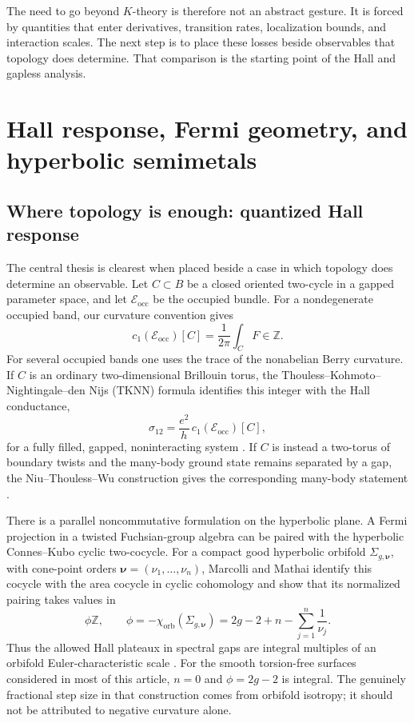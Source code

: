 \documentclass[11pt]{article}
\theoremstyle{definition}
\theoremstyle{remark}
\newcommand{\ZZ}{\mathbb Z}
\begin{document}
The need to go beyond \(K\)-theory is therefore not an abstract gesture.  It is
forced by quantities that enter derivatives, transition rates,
localization bounds, and interaction scales.  The next step is to place these
losses beside observables that topology does determine.  That comparison is
the starting point of the Hall and gapless analysis.

\section{Hall response, Fermi geometry, and hyperbolic semimetals}
\label{sec:fermi-hall}

\subsection{Where topology is enough: quantized Hall response}

The central thesis is clearest when placed beside a case in which topology
does determine an observable.  Let \(C\subset B\) be a closed oriented
two-cycle in a gapped parameter space, and let \(\mathscr E_{\mathrm{occ}}\)
be the occupied bundle.  For a nondegenerate occupied band, our curvature
convention gives
\[
       c_1(\mathscr E_{\mathrm{occ}})[C]
          =\frac{1}{2\pi}\int_C F\in\ZZ .
          \tag{8.1}\label{eq:chern-pairing-hall}
\]
For several occupied bands one uses the trace of the nonabelian Berry
curvature.  If \(C\) is an ordinary two-dimensional Brillouin torus, the
Thouless--Kohmoto--Nightingale--den Nijs (TKNN) formula identifies this
integer with the Hall conductance,
\[
       \sigma_{12}
          =\frac{e^2}{h}\,
             c_1(\mathscr E_{\mathrm{occ}})[C],
          \tag{8.2}\label{eq:tknn-hall}
\]
for a fully filled, gapped, noninteracting system
\cite{TKNN}.  If \(C\) is instead a two-torus of boundary twists and the
many-body ground state remains separated by a gap, the
Niu--Thouless--Wu construction gives the corresponding many-body statement
\cite{NiuThoulessWu}.

There is a parallel noncommutative formulation on the hyperbolic plane.  A
Fermi projection in a twisted Fuchsian-group algebra can be paired with the
hyperbolic Connes--Kubo cyclic two-cocycle.  For a compact good hyperbolic
orbifold \(\Sigma_{g,\bm\nu}\), with cone-point orders
\(\bm\nu=(\nu_1,\ldots,\nu_n)\), Marcolli and Mathai identify this cocycle
with the area cocycle in cyclic cohomology and show that its normalized
pairing takes values in
\[
             \phi\ZZ,\qquad
             \phi=-\chi_{\mathrm{orb}}(\Sigma_{g,\bm\nu})
                  =2g-2+n-\sum_{j=1}^n\frac1{\nu_j}.
\]
Thus the allowed Hall plateaux in spectral gaps are integral multiples of an
orbifold Euler-characteristic scale
\cite{MarcolliMathai2001,MarcolliMathai2006}.  For the smooth torsion-free
surfaces considered in most of this article, \(n=0\) and
\(\phi=2g-2\) is integral.  The genuinely fractional step size in that
construction comes from orbifold isotropy; it should not be attributed to
negative curvature alone.
\end{document}
